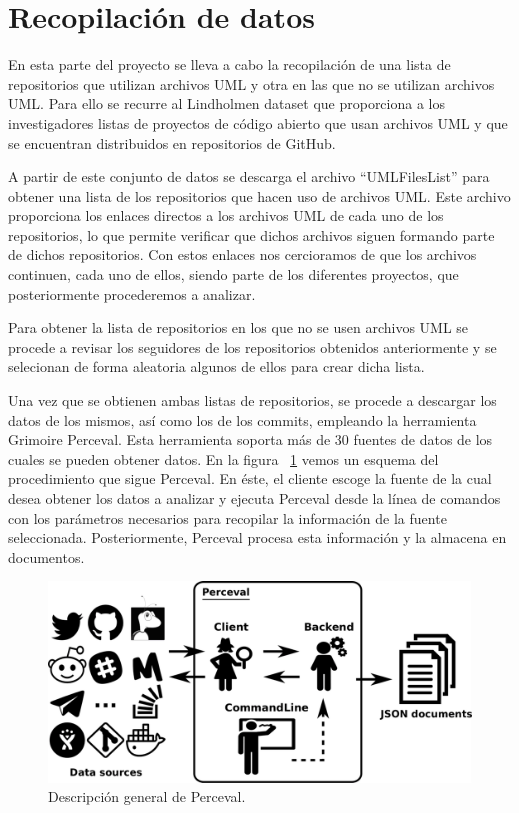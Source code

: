 \documentclass[a4paper, 12pt]{book}
\begin{document}
\section{Recopilación de datos} %
\label{sec:recopilación de datos}

En esta parte del proyecto se lleva a cabo la recopilación de una lista de repositorios que utilizan archivos UML y otra en las que no se utilizan archivos UML.
Para ello se recurre al Lindholmen dataset que proporciona a los investigadores listas de proyectos de código abierto que usan archivos UML y que se encuentran distribuidos en repositorios de GitHub.

A partir de este conjunto de datos se descarga el archivo ``UMLFilesList'' para obtener una lista de los repositorios que hacen uso de archivos UML.
Este archivo proporciona los enlaces directos a los archivos UML de cada uno de los repositorios, lo que permite verificar que dichos archivos siguen formando parte de dichos repositorios.
Con estos enlaces nos cercioramos de que los archivos continuen, cada uno de ellos, siendo parte de los diferentes proyectos, que posteriormente procederemos a analizar. 


Para obtener la lista de repositorios en los que no se usen archivos UML se procede a revisar los seguidores de los repositorios obtenidos anteriormente y se selecionan de forma aleatoria algunos de ellos para crear dicha lista.


Una vez que se obtienen ambas listas de repositorios, se procede a descargar los datos de los mismos, así como los de los commits, empleando la herramienta Grimoire Perceval.
Esta herramienta soporta más de 30 fuentes de datos de los cuales se pueden obtener datos.
En la figura ~\ref{fig:perceval-json} vemos un esquema del procedimiento que sigue Perceval. 
En éste, el cliente escoge la fuente de la cual desea obtener los datos a analizar y ejecuta Perceval desde la línea de comandos con los parámetros necesarios para recopilar la información de la fuente seleccionada.
Posteriormente, Perceval procesa esta información y la almacena en documentos. 

\begin{figure}
  \centering
  \includegraphics[width=12cm, keepaspectratio]{img/perceval-json.png}
  \caption{Descripción general de Perceval.}\label{fig:perceval-json}
\end{figure}
\end{document}
